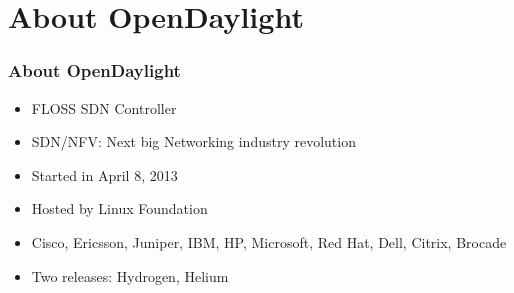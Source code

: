 \section{About OpenDaylight}

\begin{frame}
\frametitle{About OpenDaylight}

\begin{itemize}
	\item FLOSS SDN Controller
 \item SDN/NFV: Next big Networking industry revolution
	\item Started in April 8, 2013
	\item Hosted by Linux Foundation
	\item Cisco, Ericsson, Juniper, IBM, HP, Microsoft, Red Hat, Dell, Citrix, Brocade
	\item Two releases: Hydrogen, Helium
\end{itemize}

\end{frame}
